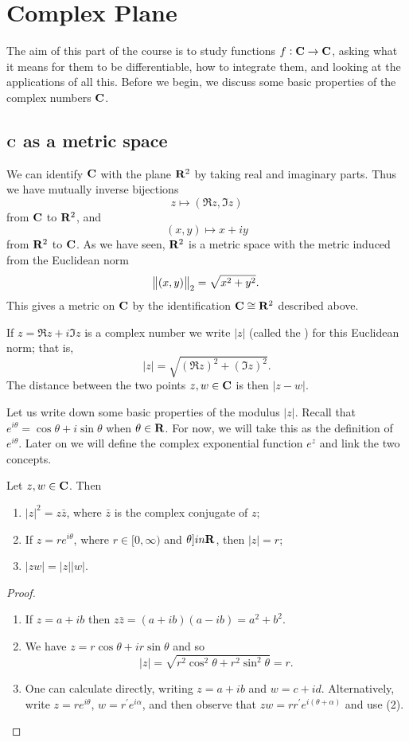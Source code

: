 \chapter{Complex Plane}
The aim of this part of the course is to study functions $f:\mathbf C\to\mathbf C$, asking what it means for them to be differentiable, how to integrate them, and looking at the applications of all this. Before we begin, we discuss some basic properties of the complex numbers $\mathbf C$.

\section{$\mathbf C$ as a metric space}
We can identify $\mathbf C$ with the plane $\mathbf R^2$ by taking
real and imaginary parts. Thus we have mutually inverse bijections
\[z\mapsto(\Re z,\Im z)\]
from $\mathbf C$ to $\mathbf R^2$, and
\[(x,y)\mapsto x+iy\]
from $\mathbf R^2$ to $\mathbf C$. As we have seen, $\mathbf R^2$ is a metric space with the metric induced from the Euclidean norm
\[\norm{(x,y)}_2=\sqrt{x^2+y^2}.\]
This gives a metric on $\mathbf C$ by the identification $\mathbf C\cong\mathbf R^2$ described above.

If $z=\Re z+i\Im z$ is a complex number we write $|z|$ (called the ) for this Euclidean norm; that is,
\[|z|=\sqrt{(\Re z)^2+(\Im z)^2}.\]
The distance between the two points $z,w\in\mathbf C$ is then $|z-w|$.

Let us write down some basic properties of the modulus $|z|$. Recall that $e^{i\theta}=\cos\theta+i\sin\theta$ when $\theta\in\mathbf R$. For now, we will take this as the definition of $e^{i\theta}$. Later on we will define the complex exponential function $e^z$ and link the two concepts.

\begin{lemma}
Let $z,w\in\mathbf C$. Then
\begin{enumerate}[label=(\arabic*)]
\item $|z|^2=z\bar{z}$, where $\bar{z}$ is the complex conjugate of $z$;
\item If $z=re^{i\theta}$, where $r\in[0,\infty)$ and $\theta]in\mathbf R$, then $|z|=r$;
\item $|zw| = |z||w|$.
\end{enumerate}
\end{lemma}

\begin{proof} \
\begin{enumerate}[label=(\arabic*)]
\item If $z=a+ib$ then $z\bar{z}=(a+ib)(a-ib)=a^2+b^2$.
\item We have $z=r\cos\theta+ir\sin\theta$ and so
\[|z|=\sqrt{r^2\cos^2\theta+r^2\sin^2\theta}=r.\]
\item One can calculate directly, writing $z=a+ib$ and $w=c+id$. Alternatively, write $z=re^{i\theta}$, $w=r^\prime e^{i\alpha}$, and then observe that $zw=rr^\prime e^{i(\theta+\alpha)}$ and use (2).
\end{enumerate}
\end{proof}

